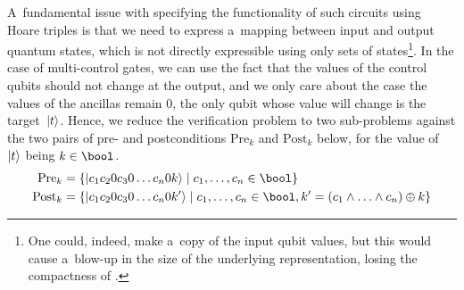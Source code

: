 A~fundamental issue with specifying the functionality of such circuits using
Hoare triples is that we need to express a~mapping between input and output quantum
states, which is not directly expressible
using only sets of states\footnote{One could, indeed, make a~copy of the input
qubit values, but this would cause a~blow-up in the size of the underlying
representation, losing the compactness of \lstas.}.
In the case of multi-control gates, we can use the fact that the values of the control qubits should
not change at the output, and we only care about the case the values of the ancillas remain $0$, the only qubit whose value will change is the target~$\ket t$.
Hence, we reduce the verification problem to two sub-problems against the two
pairs of pre- and postconditions $\mbox{Pre}_k$ and $\mbox{Post}_k$ below, for
the value of~$\ket t$ being $k\in\bool$.
%
%
%
\begin{align*}
    \mbox{Pre$_k$}={}&\{\ket{c_1 c_2 0 c_3 0 \ldots c_n 0 k}\mid c_1,\ldots, c_n\in \bool\}\\
    \mbox{Post$_k$}={}&\{\ket{c_1 c_2 0 c_3 0 \ldots c_n 0 k'}\mid c_1,\ldots, c_n\in \bool, k'= (c_1\land\ldots\land
    c_n) \oplus k\}
\end{align*}
